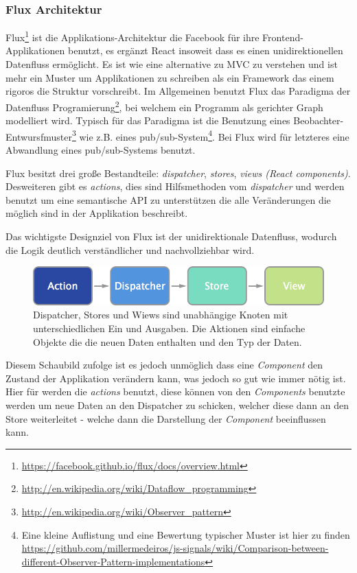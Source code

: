 \documentclass[12pt,twoside]{book}
\begin{document}
\subsubsection*{Flux Architektur}

Flux\footnote{\url{https://facebook.github.io/flux/docs/overview.html}} ist die Applikations-Architektur die Facebook für ihre Frontend-Applikationen benutzt, es ergänzt React insoweit dass es einen unidirektionellen Datenfluss ermöglicht. Es ist wie eine alternative zu MVC zu verstehen und ist mehr ein Muster um Applikationen zu schreiben als ein Framework das einem rigoros die Struktur vorschreibt. Im Allgemeinen benutzt Flux das Paradigma der Datenfluss Programierung\footnote{\url{http://en.wikipedia.org/wiki/Dataflow_programming}}, bei welchem ein Programm als gerichter Graph modelliert wird. Typisch für das Paradigma ist die Benutzung eines Beobachter-Entwursfmuster\footnote{\url{http://en.wikipedia.org/wiki/Observer_pattern}} wie z.B. eines pub/sub-System\footnote{Eine kleine Auflistung und eine Bewertung typischer Muster ist hier zu finden \url{https://github.com/millermedeiros/js-signals/wiki/Comparison-between-different-Observer-Pattern-implementations}}. Bei Flux wird für letzteres eine Abwandlung eines pub/sub-Systems benutzt.

Flux besitzt drei große Bestandteile: \textit{dispatcher}, \textit{stores}, \textit{views (React components)}. Desweiteren gibt es \textit{actions}, dies sind Hilfsmethoden vom \textit{dispatcher} und werden benutzt um eine semantische API zu unterstützen die alle Veränderungen die möglich sind in der Applikation beschreibt.

Das wichtigste Designziel von Flux ist der unidirektionale Datenfluss, wodurch die Logik deutlich verständlicher und nachvollziehbar wird.

\begin{figure}[H]
    \centering
    \includegraphics[width=1.0\textwidth]{images/flux.png}
    \caption{Dispatcher, Stores und Wiews sind unabhängige Knoten mit unterschiedlichen Ein und Ausgaben. Die Aktionen sind einfache Objekte die die neuen Daten enthalten und den Typ der Daten.}
    \label{fig:awesome_image}
\end{figure}

Diesem Schaubild zufolge ist es jedoch unmöglich dass eine \textit{Component} den Zustand der Applikation verändern kann, was jedoch so gut wie immer nötig ist. Hier für werden die \textit{actions} benutzt, diese können von den \textit{Components} benutzte werden um neue Daten an den Dispatcher zu schicken, welcher diese dann an den Store weiterleitet - welche dann die Darstellung der \textit{Component} beeinflussen kann.
\end{document}
